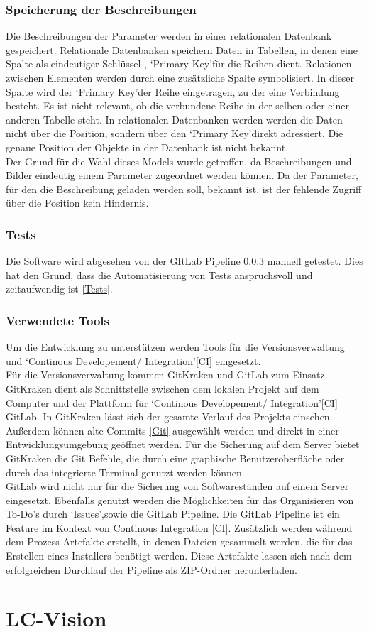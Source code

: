\documentclass[12pt,a4paper]{article}
\begin{document}
\subsubsection{Speicherung der Beschreibungen}
Die Beschreibungen der Parameter werden in einer relationalen Datenbank gespeichert. Relationale Datenbanken speichern Daten in Tabellen, in denen eine Spalte als eindeutiger Schlüssel , \lq Primary Key\rq\space für die Reihen dient. Relationen zwischen Elementen werden durch eine zusätzliche Spalte symbolisiert. In dieser Spalte wird der \lq Primary Key\rq\space der Reihe eingetragen, zu der eine Verbindung besteht. Es ist nicht relevant, ob die verbundene Reihe in der selben oder einer anderen Tabelle steht. In relationalen Datenbanken werden werden die Daten nicht über die Position, sondern über den \lq Primary Key\rq\space direkt adressiert. Die genaue Position der Objekte in der Datenbank ist nicht bekannt\cite{10.1145/1283920.1283937}.\\
Der Grund für die Wahl dieses Models wurde getroffen, da Beschreibungen und Bilder eindeutig einem Parameter zugeordnet werden können. Da der Parameter, für den die Beschreibung geladen werden soll, bekannt ist, ist der fehlende Zugriff über die Position kein Hindernis.
\subsubsection{Tests}
Die Software wird abgesehen von der GItLab Pipeline \ref{Tools} manuell getestet. Dies hat den Grund, dass die Automatisierung von Tests anspruchsvoll und zeitaufwendig ist \ref{Tests}.
\subsubsection{Verwendete Tools}
\label{Tools}
Um die Entwicklung zu unterstützen werden Tools für die Versionsverwaltung und \lq Continous Developement/ Integration\rq\space \ref{CI} eingesetzt.\\
Für die Versionsverwaltung kommen GitKraken und GitLab zum Einsatz. GitKraken dient als Schnittstelle zwischen dem lokalen Projekt auf dem Computer und der Plattform für \lq Continous Developement/ Integration\rq\space \ref{CI} GitLab. In GitKraken lässt sich der gesamte Verlauf des Projekts einsehen. Außerdem können alte Commits \ref{Git} ausgewählt werden und direkt in einer Entwicklungsumgebung geöffnet werden. Für die Sicherung auf dem Server bietet GitKraken die Git Befehle, die durch eine graphische Benutzeroberfläche oder durch das integrierte Terminal genutzt werden können.\\
GitLab wird nicht nur für die Sicherung von Softwareständen auf einem Server eingesetzt. Ebenfalls genutzt werden die Möglichkeiten für das Organisieren von To-Do's durch \lq Issues\rq ,\space sowie die GitLab Pipeline. Die GitLab Pipeline ist ein Feature im Kontext von Continous Integration \ref{CI}. Zusätzlich werden während dem Prozess Artefakte erstellt, in denen Dateien gesammelt werden, die für das Erstellen eines Installers benötigt werden. Diese Artefakte lassen sich nach dem erfolgreichen Durchlauf der Pipeline als ZIP-Ordner herunterladen.\\
\section{LC-Vision}

\newpage


\end{document}

